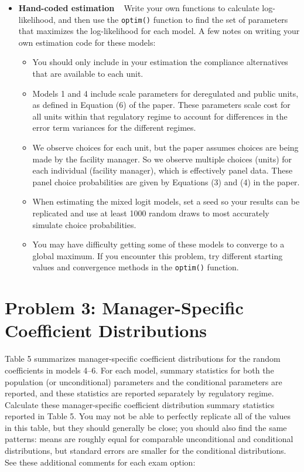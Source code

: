 \documentclass[11pt,letterpaper]{article}
\begin{document}
\begin{itemize}[label={}, leftmargin=*]
	\item \textbf{Hand-coded estimation} ~ Write your own functions to calculate log-likelihood, and then use the \texttt{optim()} function to find the set of parameters that maximizes the log-likelihood for each model. A few notes on writing your own estimation code for these models:
	\begin{itemize}
		\item You should only include in your estimation the compliance alternatives that are available to each unit.
		\item Models 1 and 4 include scale parameters for deregulated and public units, as defined in Equation (6) of the paper. These parameters scale cost for all units within that regulatory regime to account for differences in the error term variances for the different regimes.
		\item We observe choices for each unit, but the paper assumes choices are being made by the facility manager. So we observe multiple choices (units) for each individual (facility manager), which is effectively panel data. These panel choice probabilities are given by Equations (3) and (4) in the paper.
		\item When estimating the mixed logit models, set a seed so your results can be replicated and use at least 1000 random draws to most accurately simulate choice probabilities.
		\item You may have difficulty getting some of these models to converge to a global maximum. If you encounter this problem, try different starting values and convergence methods in the \texttt{optim()} function.
	\end{itemize}
\end{itemize}

\section*{Problem 3: Manager-Specific Coefficient Distributions}

Table 5 summarizes manager-specific coefficient distributions for the random coefficients in models 4--6. For each model, summary statistics for both the population (or unconditional) parameters and the conditional parameters are reported, and these statistics are reported separately by regulatory regime. Calculate these manager-specific coefficient distribution summary statistics reported in Table 5. You may not be able to perfectly replicate all of the values in this table, but they should generally be close; you should also find the same patterns: means are roughly equal for comparable unconditional and conditional distributions, but standard errors are smaller for the conditional distributions. See these additional comments for each exam option:
\end{document}
